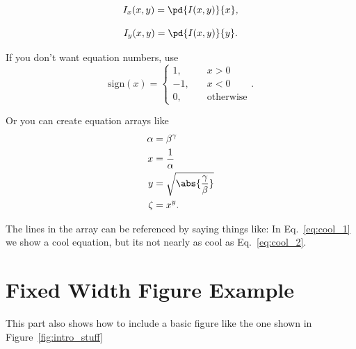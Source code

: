 \begin{equation} \label{eqn:definition_Ix}
I_x(x,y) = \pd{I(x,y)}{x},
\end{equation}

\begin{equation}\label{eqn:definition_Iy}
I_y(x,y) = \pd{I(x,y)}{y}.
\end{equation}

If you don't want equation numbers, use
\[
\text{sign}(x) = \begin{cases}
                 1,  &\quad x> 0 \\
                 -1, &\quad x<0 \\
                 0,  &\quad \text{otherwise}
                 \end{cases}.
\]


 Or you can create equation arrays like
\begin{align}
  \alpha &= \beta^\gamma \notag \\
  x &= \frac{1}{\alpha} \label{eq:cool_1} \\
  y &= \sqrt{\abs{\frac{\gamma}{\beta}}} \notag \\
  \zeta &= x^y \label{eq:cool_2}.
\end{align}


The lines in the array can be referenced by saying things like: In
Eq.~\eqref{eq:cool_1} we show a cool equation, but its not nearly as
cool as Eq.~\eqref{eq:cool_2}.

\section{Fixed Width Figure Example} \label{sec:intro_figure_example}
This part also shows how to include a basic figure like the one
shown in Figure~\ref{fig:intro_stuff}


